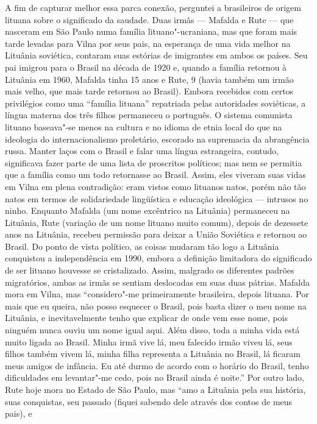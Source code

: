 {A fim de capturar melhor essa parca conexão, perguntei a brasileiros de
origem lituana sobre o significado da saudade. Duas irmãs --- Mafalda e
Rute --- que nasceram em São Paulo numa família lituano"-ucraniana, mas que
foram mais tarde levadas para Vilna por seus pais, na esperança de uma
vida melhor na Lituânia soviética, contaram suas estórias de imigrantes
em ambos os países. Seu pai imigrou para o Brasil na década de 1920 e,
quando a família retornou à Lituânia em 1960, Mafalda tinha 15 anos e
Rute, 9 (havia também um irmão mais velho, que mais tarde retornou ao
Brasil). Embora recebidos com certos privilégios como uma ``família
lituana'' repatriada pelas autoridades soviéticas, a língua materna dos
três filhos permaneceu o português. O sistema comunista lituano
baseava"-se menos na cultura e no idioma de etnia local do que na
ideologia do internacionalismo proletário, escorado na supremacia da
abrangência russa. Manter laços com o Brasil e falar uma língua
estrangeira, contudo, significava fazer parte de uma lista de proscritos
políticos; mas nem se permitia que a família como um todo retornasse ao
Brasil. Assim, eles viveram suas vidas em Vilna em plena contradição:
eram vistos como lituanos natos, porém não tão natos em termos de
solidariedade lingüística e educação ideológica --- intrusos no ninho.
Enquanto Mafalda (um nome excêntrico na Lituânia) permaneceu na
Lituânia, Rute (variação de um nome lituano muito comum), depois de
dezessete anos na Lituânia, recebeu permissão para deixar a União
Soviética e retornou ao Brasil. Do ponto de vista político, as coisas
mudaram tão logo a Lituânia conquistou a independência em 1990, embora a
definição limitadora do significado de ser lituano houvesse se
cristalizado. Assim, malgrado os diferentes padrões migratórios, ambas
as irmãs se sentiam deslocadas em suas duas pátrias. Mafalda mora em
Vilna, mas ``considero"-me primeiramente brasileira, depois lituana. Por
mais que eu queira, não posso esquecer o Brasil, pois basta dizer o meu
nome na Lituânia, e inevitavelmente tenho que explicar de onde vem esse
nome, pois ninguém nunca ouviu um nome igual aqui. Além disso, toda a
minha vida está muito ligada ao Brasil. Minha irmã vive lá, meu falecido
irmão viveu lá, seus filhos também vivem lá, minha filha representa a
Lituânia no Brasil, lá ficaram meus amigos de infância. Eu até durmo de
acordo com o horário do Brasil, tenho dificuldades em levantar"-me cedo,
pois no Brasil ainda é noite.'' Por outro lado, Rute hoje mora no Estado
de São Paulo, mas ``amo a Lituânia pela sua história, suas conquistas,
seu passado (fiquei sabendo dele através dos contos de meus pais), e
}
